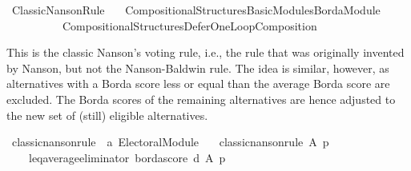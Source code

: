 %
\begin{isabellebody}%
%
%
\isadelimdocument
\isanewline
%
\endisadelimdocument
%
\isatagdocument
\isanewline
%
\isamarkuptrue%
%
\endisatagdocument
{\isafolddocument}%
%
\isadelimdocument
%
\endisadelimdocument
%
\isadelimtheory
%
\endisadelimtheory
%
\isatagtheory
{}\isamarkupfalse%
\ Classic{\isacharunderscore}{\kern0pt}Nanson{\isacharunderscore}{\kern0pt}Rule\isanewline
\ \ \ {\isachardoublequoteopen}Compositional{\isacharunderscore}{\kern0pt}Structures{\isacharslash}{\kern0pt}Basic{\isacharunderscore}{\kern0pt}Modules{\isacharslash}{\kern0pt}Borda{\isacharunderscore}{\kern0pt}Module{\isachardoublequoteclose}\isanewline
\ \ \ \ \ \ \ \ \ \ {\isachardoublequoteopen}Compositional{\isacharunderscore}{\kern0pt}Structures{\isacharslash}{\kern0pt}Defer{\isacharunderscore}{\kern0pt}One{\isacharunderscore}{\kern0pt}Loop{\isacharunderscore}{\kern0pt}Composition{\isachardoublequoteclose}\isanewline
{}%
\endisatagtheory
{\isafoldtheory}%
%
\isadelimtheory
%
\endisadelimtheory
%
\begin{isamarkuptext}%
This is the classic Nanson's voting rule, i.e., the rule that was originally
invented by Nanson, but not the Nanson-Baldwin rule. The idea is similar,
however, as alternatives with a Borda score less or equal than the average
Borda score are excluded. The Borda scores of the remaining alternatives
are hence adjusted to the new set of (still) eligible alternatives.%
\end{isamarkuptext}\isamarkuptrue%
%
\isadelimdocument
%
\endisadelimdocument
%
\isatagdocument
%
\isamarkuptrue%
%
\endisatagdocument
{\isafolddocument}%
%
\isadelimdocument
%
\endisadelimdocument
{}\isamarkupfalse%
\ classic{\isacharunderscore}{\kern0pt}nanson{\isacharunderscore}{\kern0pt}rule\ {\isacharcolon}{\kern0pt}{\isacharcolon}{\kern0pt}\ {\isachardoublequoteopen}{\isacharprime}{\kern0pt}a\ Electoral{\isacharunderscore}{\kern0pt}Module{\isachardoublequoteclose}\ \isanewline
\ \ {\isachardoublequoteopen}classic{\isacharunderscore}{\kern0pt}nanson{\isacharunderscore}{\kern0pt}rule\ A\ p\ {\isacharequal}{\kern0pt}\isanewline
\ \ \ \ {\isacharparenleft}{\kern0pt}{\isacharparenleft}{\kern0pt}leq{\isacharunderscore}{\kern0pt}average{\isacharunderscore}{\kern0pt}eliminator\ borda{\isacharunderscore}{\kern0pt}score{\isacharparenright}{\kern0pt}\ {\isasymcirclearrowleft}\isactrlsub {\isasymexists}\isactrlsub {\isacharbang}{\kern0pt}\isactrlsub d{\isacharparenright}{\kern0pt}\ A\ p{\isachardoublequoteclose}\isanewline

\end{isabellebody}
